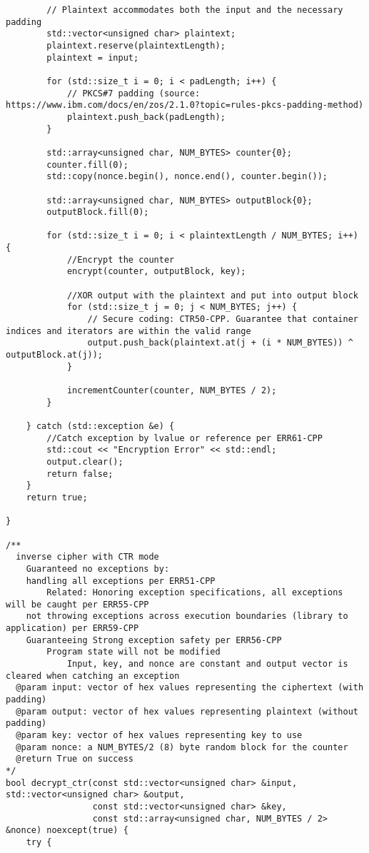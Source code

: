 \documentclass[a4paper,12pt]{article}
\begin{document}
{\begin{lstlisting}
        // Plaintext accommodates both the input and the necessary padding
        std::vector<unsigned char> plaintext;
        plaintext.reserve(plaintextLength);
        plaintext = input;

        for (std::size_t i = 0; i < padLength; i++) {
            // PKCS#7 padding (source: https://www.ibm.com/docs/en/zos/2.1.0?topic=rules-pkcs-padding-method)
            plaintext.push_back(padLength);
        }

        std::array<unsigned char, NUM_BYTES> counter{0};
        counter.fill(0);
        std::copy(nonce.begin(), nonce.end(), counter.begin());

        std::array<unsigned char, NUM_BYTES> outputBlock{0};
        outputBlock.fill(0);

        for (std::size_t i = 0; i < plaintextLength / NUM_BYTES; i++) {
            //Encrypt the counter
            encrypt(counter, outputBlock, key);

            //XOR output with the plaintext and put into output block
            for (std::size_t j = 0; j < NUM_BYTES; j++) {
                // Secure coding: CTR50-CPP. Guarantee that container indices and iterators are within the valid range
                output.push_back(plaintext.at(j + (i * NUM_BYTES)) ^ outputBlock.at(j));
            }

            incrementCounter(counter, NUM_BYTES / 2);
        }

    } catch (std::exception &e) {
        //Catch exception by lvalue or reference per ERR61-CPP
        std::cout << "Encryption Error" << std::endl;
        output.clear();
        return false;
    }
    return true;

}

/**
  inverse cipher with CTR mode
    Guaranteed no exceptions by:
    handling all exceptions per ERR51-CPP
        Related: Honoring exception specifications, all exceptions will be caught per ERR55-CPP
    not throwing exceptions across execution boundaries (library to application) per ERR59-CPP
    Guaranteeing Strong exception safety per ERR56-CPP
        Program state will not be modified
            Input, key, and nonce are constant and output vector is cleared when catching an exception
  @param input: vector of hex values representing the ciphertext (with padding)
  @param output: vector of hex values representing plaintext (without padding)
  @param key: vector of hex values representing key to use
  @param nonce: a NUM_BYTES/2 (8) byte random block for the counter
  @return True on success
*/
bool decrypt_ctr(const std::vector<unsigned char> &input, std::vector<unsigned char> &output,
                 const std::vector<unsigned char> &key,
                 const std::array<unsigned char, NUM_BYTES / 2> &nonce) noexcept(true) {
    try {


\end{lstlisting}}
\end{document}
